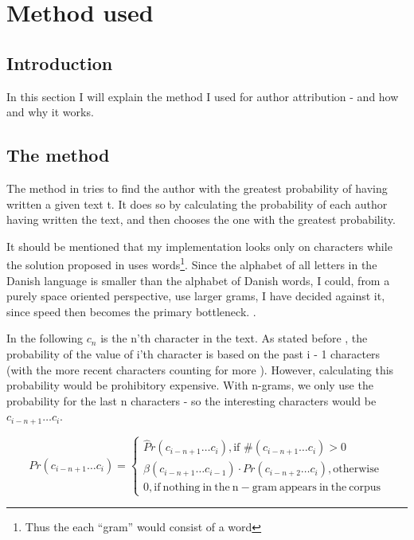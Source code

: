 \section{Method used}
\label{method}

\subsection{Introduction}
In this section I will explain the method I used for author attribution - and how and why it works.

\subsection{The method}
The method in \cite{4} tries to find the author with the greatest probability of having written a given text t. It does so by calculating the probability of each author having written the text, and then chooses the one with the greatest probability.

It should be mentioned that my implementation looks only on characters while the solution proposed in \cite{nr4} uses words\footnote{Thus the each ``gram'' would consist of a word}. Since the alphabet of all letters in the Danish language is smaller than the alphabet of Danish words, I could, from a purely space oriented perspective, use larger grams, I have decided against it, since speed then becomes the primary bottleneck. .

In the following $c_n$ is the n'th character in the text. As stated before , the probability of the value of i'th character is based on the past i - 1 characters (with the more recent characters counting for more ). However, calculating this probability would be prohibitory expensive. With n-grams, we only use the probability for the last n characters - so the interesting characters would be $c_{i - n + 1} \ldots c_{i}$.

\begin{equation}
\label{eq:probNorm}
Pr(c_{i - n + 1} \ldots c_{i}) = \left\{
\begin{array}{rl}
\hat{P}r(c_{i - n + 1} \ldots c_{i}), \text{if } \#(c_{i - n + 1} \ldots c_{i}) > 0\\
\beta(c_{i - n + 1} \ldots c_{i-1}) \cdot Pr(c_{i - n + 2} \ldots c_{i}), \mathrm{otherwise}\\
0, \mathrm{if\ nothing\ in\ the\ n-gram\ appears\ in\ the\ corpus}
\end{array} \right.
\end{equation}


